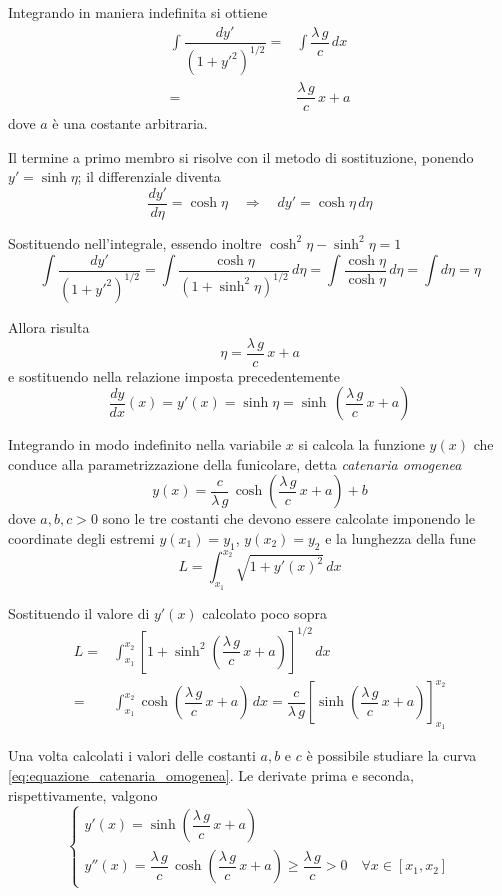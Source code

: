 Integrando in maniera indefinita si ottiene
\begin{align*}
 \int \dfrac{dy'}{\left(1+y'^2\right)^{1/2}} =&\int \dfrac{\lambda\,g}{c}\,dx\\
 =& \dfrac{\lambda\,g}{c}\,x + a
\end{align*}
dove $a$ è una costante arbitraria.

Il termine a primo membro si risolve con il metodo di sostituzione, ponendo $y' = \sinh \eta$; il differenziale diventa
\[
 \dfrac{dy'}{d\eta} = \cosh\eta \quad \Longrightarrow\quad dy' = \cosh\eta\,d\eta
\]

Sostituendo nell'integrale, essendo inoltre $\cosh^2\eta - \sinh^2\eta = 1$
\[
 \int \dfrac{dy'}{\left(1+y'^2\right)^{1/2}} = \int \dfrac{\cosh\eta}{(1+\sinh^2\eta)^{1/2}}\,d\eta = \int \dfrac{\cosh\eta}{\cosh\eta}\,d\eta = \int d\eta = \eta
\]

Allora risulta
\[
\eta = \dfrac{\lambda\,g}{c}\,x + a    
\]
e sostituendo nella relazione imposta precedentemente
\[
\dfrac{dy}{dx}(x) = y'(x) = \sinh \eta = \sinh\,\left(\dfrac{\lambda\,g}{c}\,x + a\right) 
\]

Integrando in modo indefinito nella variabile $x$ si calcola la funzione $y(x)$ che conduce alla parametrizzazione della funicolare, detta \emph{catenaria omogenea}
\begin{equation}
\label{eq:equazione_catenaria_omogenea}
y(x) = \dfrac{c}{\lambda\,g}\,\cosh\left(\dfrac{\lambda\,g}{c}\,x +a\right) + b
\end{equation}
dove $a,b,c>0$ sono le tre costanti che devono essere calcolate imponendo le coordinate degli estremi $y(x_1) = y_1$, $y(x_2) = y_2$ e la lunghezza della fune
\[
  L = \int_{x_1}^{x_2} \sqrt{1+y'(x)^2}\,dx  
\]

Sostituendo il valore di $y'(x)$ calcolato poco sopra
\begin{align*}
 L =& \int_{x_1}^{x_2} \left[1+\sinh^2\left(\dfrac{\lambda\,g}{c}\,x +a\right)\right]^{1/2}\,dx\\
  =& \int_{x_1}^{x_2} \cosh\left(\dfrac{\lambda\,g}{c}\,x +a\right)\,dx = \dfrac{c}{\lambda\,g}\left[\sinh\left( \dfrac{\lambda\,g}{c}\,x +a\right)\right]_{x_1}^{x_2}
\end{align*}

Una volta calcolati i valori delle costanti $a, b$ e $c$ è possibile studiare la curva \eqref{eq:equazione_catenaria_omogenea}. Le derivate prima e seconda, rispettivamente, valgono
\[
\begin{cases}
 y'(x) = \sinh\left(\dfrac{\lambda\,g}{c}\,x +a\right)\\
 y''(x) = \dfrac{\lambda\,g}{c}\,\cosh\left(\dfrac{\lambda\,g}{c}\,x + a\right) \geq \dfrac{\lambda\,g}{c}>0\quad \forall x \in[x_1, x_2] 
 \end{cases}
\]


